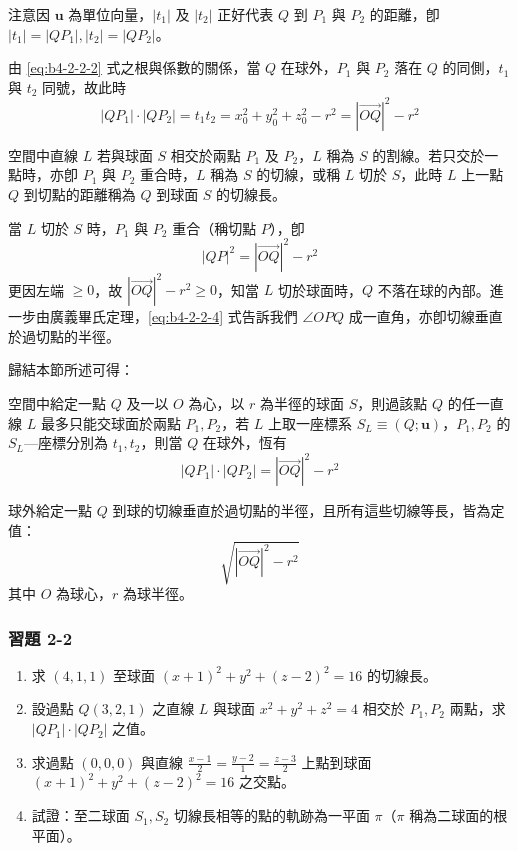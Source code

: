 注意因 $\mathbf{u}$ 為單位向量，$|t_1|$ 及 $|t_2|$ 正好代表 $Q$ 到 $P_1$ 與 $P_2$ 的距離，卽 $|t_1| = |QP_1|, |t_2| = |QP_2|$。

由 \eqref{eq:b4-2-2-2} 式之根與係數的關係，當 $Q$ 在球外，$P_1$ 與 $P_2$ 落在 $Q$ 的同側，$t_1$ 與 $t_2$ 同號，故此時
\begin{equation}
|QP_1| \cdot |QP_2| = t_1 t_2 = x_0^2 + y_0^2 + z_0^2 - r^2 = |\vec{OQ}|^2 - r^2 \label{eq:b4-2-2-3}
\end{equation}

\begin{definition}[定義]
空間中直線 $L$ 若與球面 $S$ 相交於兩點 $P_1$ 及 $P_2$，$L$ 稱為 $S$ 的割線。若只交於一點時，亦卽 $P_1$ 與 $P_2$ 重合時，$L$ 稱為 $S$ 的切線，或稱 $L$ 切於 $S$，此時 $L$ 上一點 $Q$ 到切點的距離稱為 $Q$ 到球面 $S$ 的切線長。
\end{definition}

當 $L$ 切於 $S$ 時，$P_1$ 與 $P_2$ 重合（稱切點 $P$），卽
\begin{equation}
|QP|^2 = |\vec{OQ}|^2 - r^2 \label{eq:b4-2-2-4}
\end{equation}
更因左端 $\ge 0$，故 $|\vec{OQ}|^2 - r^2 \ge 0$，知當 $L$ 切於球面時，$Q$ 不落在球的內部。進一步由廣義畢氏定理，\eqref{eq:b4-2-2-4} 式告訴我們 $\angle OPQ$ 成一直角，亦卽切線垂直於過切點的半徑。

歸結本節所述可得：

\begin{theorem}[定理 1（球的割線定理）]
空間中給定一點 $Q$ 及一以 $O$ 為心，以 $r$ 為半徑的球面 $S$，則過該點 $Q$ 的任一直線 $L$ 最多只能交球面於兩點 $P_1, P_2$，若 $L$ 上取一座標系 $S_L \equiv (Q; \mathbf{u})$，$P_1, P_2$ 的 $S_L$---座標分別為 $t_1, t_2$，則當 $Q$ 在球外，恆有
\[ |QP_1| \cdot |QP_2| = |\vec{OQ}|^2 - r^2 \]
\end{theorem}

\begin{theorem}[定理 1'（球的切線長定理）]
球外給定一點 $Q$ 到球的切線垂直於過切點的半徑，且所有這些切線等長，皆為定值：
\[ \sqrt{|\vec{OQ}|^2 - r^2} \]
其中 $O$ 為球心，$r$ 為球半徑。
\end{theorem}

\subsubsection*{習題 2-2}
\begin{enumerate}
  \item 求 $(4, 1, 1)$ 至球面 $(x+1)^2 + y^2 + (z-2)^2 = 16$ 的切線長。
  \item 設過點 $Q(3, 2, 1)$ 之直線 $L$ 與球面 $x^2 + y^2 + z^2 = 4$ 相交於 $P_1, P_2$ 兩點，求 $|QP_1| \cdot |QP_2|$ 之值。
  \item 求過點 $(0, 0, 0)$ 與直線 $\frac{x-1}{2} = \frac{y-2}{1} = \frac{z-3}{2}$ 上點到球面 $(x+1)^2 + y^2 + (z-2)^2 = 16$ 之交點。
  \item 試證：至二球面 $S_1, S_2$ 切線長相等的點的軌跡為一平面 $\pi$（$\pi$ 稱為二球面的根平面）。
\end{enumerate}

